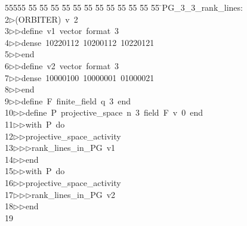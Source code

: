 %
%
\begin{tabbing}
55555 \= 55 \= 55 \= 55 \= 55 \= 55 \= 55 \= 55 \= 55 \= 55 \= 55 \= 55 \= 55 \= \>PG\_3\_3\_rank\_lines:\\[0pt]
2\>$\triangleright$\>(ORBITER)\ v\ 2\ \\[0pt]
3\>$\triangleright$\>$\triangleright$\>define\ v1\ vector\ format\ 3\ \\[0pt]
4\>$\triangleright$\>$\triangleright$\>dense\ 10220112\ 10200112\ 10220121\ \\[0pt]
5\>$\triangleright$\>$\triangleright$\>end\ \\[0pt]
6\>$\triangleright$\>$\triangleright$\>define\ v2\ vector\ format\ 3\ \\[0pt]
7\>$\triangleright$\>$\triangleright$\>dense\ 10000100\ 10000001\ 01000021\ \\[0pt]
8\>$\triangleright$\>$\triangleright$\>end\ \\[0pt]
9\>$\triangleright$\>$\triangleright$\>define\ F\ finite\_field\ q\ 3\ end\ \\[0pt]
10\>$\triangleright$\>$\triangleright$\>define\ P\ projective\_space\ n\ 3\ field\ F\ v\ 0\ end\ \\[0pt]
11\>$\triangleright$\>$\triangleright$\>with\ P\ do\ \\[0pt]
12\>$\triangleright$\>$\triangleright$\>projective\_space\_activity\ \\[0pt]
13\>$\triangleright$\>$\triangleright$\>$\triangleright$\>rank\_lines\_in\_PG\ v1\ \\[0pt]
14\>$\triangleright$\>$\triangleright$\>end\ \\[0pt]
15\>$\triangleright$\>$\triangleright$\>with\ P\ do\ \\[0pt]
16\>$\triangleright$\>$\triangleright$\>projective\_space\_activity\ \\[0pt]
17\>$\triangleright$\>$\triangleright$\>$\triangleright$\>rank\_lines\_in\_PG\ v2\ \\[0pt]
18\>$\triangleright$\>$\triangleright$\>end\\[0pt]
19\>\end{tabbing}
